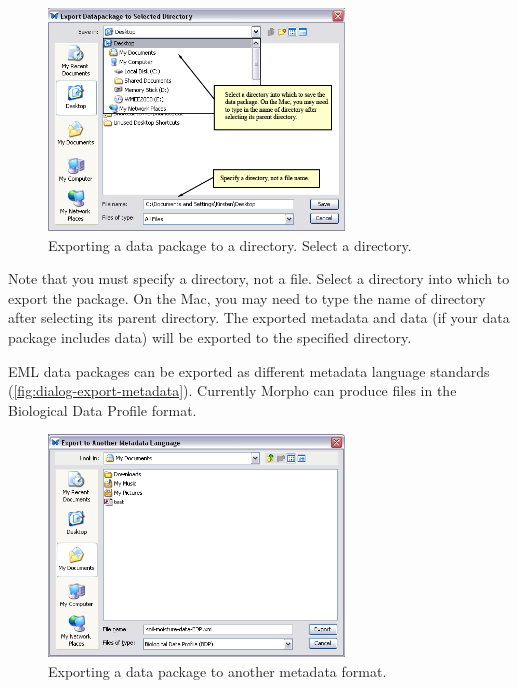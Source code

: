 \begin{figure}
  \centering
    \includegraphics[width=0.7\textwidth]{images/dialog-export-package.jpg}
  \caption{Exporting a data package to a directory. Select a directory.}
  \label{fig:dialog-export-package}
\end{figure}

Note that you must specify a directory, not a file. Select a directory
into which to export the package. On the Mac, you may need to type the
name of directory after selecting its parent directory. The exported
metadata and data (if your data package includes data) will be exported
to the specified directory.

EML data packages can be exported as different metadata language
standards (\autoref{fig:dialog-export-metadata}). Currently Morpho can
produce files in the Biological Data Profile format.

\begin{figure}
  \centering
    \includegraphics[width=0.7\textwidth]{images/dialog-export-metadata.png}
  \caption{Exporting a data package to another metadata format.}
  \label{fig:dialog-export-metadata}
\end{figure}

